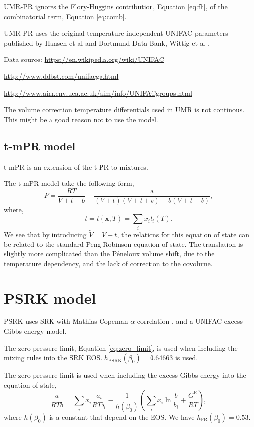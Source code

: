 \documentclass[english]{../thermomemo/thermomemo}
\newcommand*{\vektor}[1]{\boldsymbol{#1}}%
\newcommand{\excess}{\text{E}\xspace}
\begin{document}
UMR-PR ignores the Flory-Huggins contribution, Equation \ref{eq:fh},
of the combinatorial term, Equation \ref{eq:comb}.

UMR-PR uses the original temperature independent UNIFAC parameters published by Hansen et al \cite{Hansen1991} and Dortmund Data Bank, Wittig et al \cite{Wittig2003}.

Data source:
\url{https://en.wikipedia.org/wiki/UNIFAC}

\url{http://www.ddbst.com/unifacga.html}

\url{http://www.aim.env.uea.ac.uk/aim/info/UNIFACgroups.html}

The volume correction temperature differentials used in UMR is not
continous. This might be a good reason not to use the model.


\subsection{t-mPR model}
t-mPR \cite{Avlonitis1994} is an extension of the t-PR
\cite{Magoulas1990} to mixtures.

The t-mPR model take the following form,
\begin{equation}
  \label{eq:t-mPR}
  P = \frac{RT}{V+t-b} - \frac{a}{(V+t)(V+t+b) + b(V+t-b)},
\end{equation}
where,
\begin{equation}
  \label{eq:tmix}
  t = t(\vektor{x},T) = \underset{i}{\sum} x_i t_i(T).
\end{equation}
We see that by introducing $\tilde{V} = V + t$, the relations for this
equation of state can be related to the standard Peng-Robinson
equation of state. The translation is slightly more complicated than
the P{\'e}neloux \cite{Peneloux1982} volume shift, due to the
temperature dependency, and the lack of correction to the covolume.

\section{PSRK model}
PSRK \cite{Holderbaum1991} uses SRK with Mathias-Copeman
$\alpha$-correlation \cite{Mathias1983}, and a UNIFAC excess Gibbs
energy model. 

The zero pressure limit, Equation \ref{eq:zero_limit},
is used when including the mixing rules into the SRK EOS.
$h_{\text{PSRK}}(\beta_0) = 0.64663$ is used.

The zero pressure limit is used when including the excess Gibbs energy into the equation of state,
\begin{equation}
  \label{eq:zero_limit}
  \frac{a}{RTb} = \underset{i}{\sum} x_i \frac{a_i}{RTb_i} - \frac{1}{h(\beta_0)}\left(\underset{i}{\sum} x_i \ln \frac{b}{b_i} + \frac{G^\excess}{RT} \right),
\end{equation}
where $h(\beta_0)$ is a constant that depend on the EOS. We have $h_{\text{PR}}(\beta_0) = 0.53$.
\end{document}
